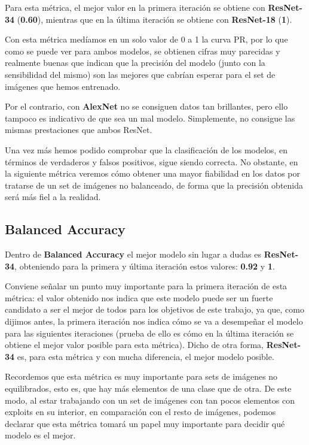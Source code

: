 Para esta métrica, el mejor valor en la primera iteración se obtiene con \textbf{ResNet-34} (\textbf{0.60}), mientras que en la última iteración se obtiene con \textbf{ResNet-18} (\textbf{1}).

Con esta métrica medíamos en un solo valor de 0 a 1 la curva \ac{PR}, por lo que como se puede ver para ambos modelos, se obtienen cifras muy parecidas y realmente buenas que indican que la precisión del modelo (junto con la sensibilidad del mismo) son las mejores que cabrían esperar para el set de imágenes que hemos entrenado.

Por el contrario, con \textbf{AlexNet} no se consiguen datos tan brillantes, pero ello tampoco es indicativo de que sea un mal modelo. Simplemente, no consigue las mismas prestaciones que ambos ResNet.

Una vez más hemos podido comprobar que la clasificación de los modelos, en términos de verdaderos y falsos positivos, sigue siendo correcta. No obstante, en la siguiente métrica veremos cómo obtener una mayor fiabilidad en los datos por tratarse de un set de imágenes no balanceado, de forma que la precisión obtenida será más fiel a la realidad.

\subsection{Balanced Accuracy}

Dentro de \textbf{Balanced Accuracy} el mejor modelo sin lugar a dudas es \textbf{ResNet-34}, obteniendo para la primera y última iteración estos valores: \textbf{0.92} y \textbf{1}.

Conviene señalar un punto muy importante para la primera iteración de esta métrica: el valor obtenido nos indica que este modelo puede ser un fuerte candidato a ser el mejor de todos para los objetivos de este trabajo, ya que, como dijimos antes, la primera iteración nos indica cómo se va a desempeñar el modelo para las siguientes iteraciones (prueba de ello es cómo en la última iteración se obtiene el mejor valor posible para esta métrica). Dicho de otra forma, \textbf{ResNet-34} es, para esta métrica y con mucha diferencia, el mejor modelo posible.

Recordemos que esta métrica es muy importante para sets de imágenes no equilibrados, esto es, que hay más elementos de una clase que de otra. De este modo, al estar trabajando con un set de imágenes con tan pocos elementos con exploits en su interior, en comparación con el resto de imágenes, podemos declarar que esta métrica tomará un papel muy importante para decidir qué modelo es el mejor.

